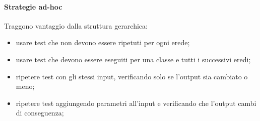 \paragraph{Strategie ad-hoc} Traggono vantaggio dalla struttura gerarchica:
\begin{itemize}
	\item usare test che non devono essere ripetuti per ogni erede;
	\item usare test che devono essere eseguiti per una classe e tutti i successivi eredi;
	\item ripetere test con gli stessi input, verificando solo se l'output sia cambiato o meno;
	\item ripetere test aggiungendo parametri all'input e verificando che l'output cambi di conseguenza; 
\end{itemize}

\newpage